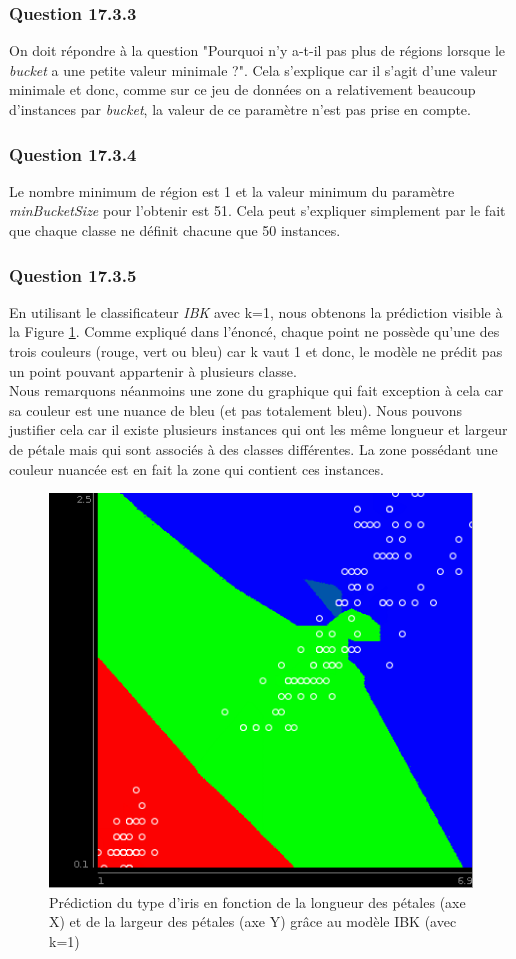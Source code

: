 \documentclass[10pt,a4paper]{article}
\begin{document}
			\subsubsection*{Question 17.3.3}
			
			On doit répondre à la question "Pourquoi n'y a-t-il pas plus de régions lorsque le \textit{bucket} a une petite valeur minimale ?". Cela s'explique car il s'agit d'une valeur minimale et donc, comme sur ce jeu de données on a relativement beaucoup d'instances par \textit{bucket}, la valeur de ce paramètre n'est pas prise en compte.
			
			\subsubsection*{Question 17.3.4}
			
			Le nombre minimum de région est 1 et la valeur minimum du paramètre \textit{minBucketSize} pour l'obtenir est 51. Cela peut s'expliquer simplement par le fait que chaque classe ne définit chacune que 50 instances.
			
			\subsubsection*{Question 17.3.5}
			
			En utilisant le classificateur \textit{IBK} avec k=1, nous obtenons la prédiction visible à la Figure \ref{fig:iris:IB1}. Comme expliqué dans l'énoncé, chaque point ne possède qu'une des trois couleurs (rouge, vert ou bleu) car k vaut 1 et donc, le modèle ne prédit pas un point pouvant appartenir à plusieurs classe.\\
			
			Nous remarquons néanmoins une zone du graphique qui fait exception à cela car sa couleur est une nuance de bleu (et pas totalement bleu). Nous pouvons justifier cela car il existe plusieurs instances qui ont les même longueur et largeur de pétale mais qui sont associés à des classes différentes. La zone possédant une couleur nuancée est en fait la zone qui contient ces instances.   
			
			\begin{figure}[h]
				\centering
				\includegraphics[width=.5\textwidth]{iris_IB1}
				\caption{Prédiction du type d'iris en fonction de la longueur des pétales (axe X) et de la largeur des pétales (axe Y) grâce au modèle IBK (avec k=1)}
				\label{fig:iris:IB1}
			\end{figure}
			
\end{document}
